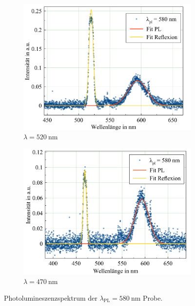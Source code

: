 \begin{figure}[H]
  \centering
  \begin{subfigure}{0.49\textwidth}
    \includegraphics[width=\textwidth]{plots/Weisslicht_580_520.png}
    \caption{$\lambda=\SI{520}{\nano\meter}$}
    \label{fig:PL_580_normus}
  \end{subfigure}
  \begin{subfigure}{0.49\textwidth}
    \includegraphics[width=\textwidth]{plots/Weisslicht_580_470.png}
    \caption{$\lambda=\SI{470}{\nano\meter}$}
    \label{fig:PL_580_Satt}
  \end{subfigure}
  \caption{Photolumineszenzspektrum der $\lambda_{\text{PL}}=\SI{580}{\nano\meter}$ Probe.}
  \label{fig:PL_580}
\end{figure}

